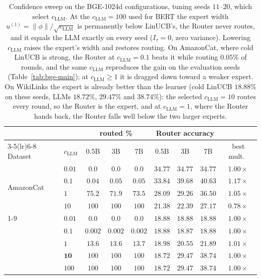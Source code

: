 \documentclass[anon]{alt2027} %
\begin{document}
\begin{table}[ht]
\centering
\caption{Confidence sweep on the BGE-1024d configurations, tuning seeds
$11$--$20$, which select $c_{\mathrm{LLM}}$. At the
$c_{\mathrm{LLM}}=100$ used for BERT the expert width $u^{(1)}=\|\phi\|/\sqrt{c_{\mathrm{LLM}}}$ is
permanently below LinUCB's, the Router never routes, and it equals the
LLM exactly on every seed ($I_\tau=0$, zero variance). Lowering $c_{\mathrm{LLM}}$ raises the
expert's width and restores routing. On AmazonCat, where cold LinUCB is
strong, the Router at $c_{\mathrm{LLM}}=0.1$ beats it while routing $0.05\%$ of rounds, and
the same $c_{\mathrm{LLM}}$ reproduces the gain on the evaluation seeds
(Table~\ref{tab:bge-main}); at $c_{\mathrm{LLM}}\ge1$ it is dragged down toward a
weaker expert. On WikiLinks the expert is
already better than the learner (cold
LinUCB $18.88\%$ on these seeds, LLMs $18.72\%$, $29.47\%$ and $38.74\%$): the
selected $c_{\mathrm{LLM}}=10$ routes every round, so the Router is the expert, and at
$c_{\mathrm{LLM}}=1$, where the Router hands back, the Router falls well below the two
larger experts.}
\label{tab:bge-csweep}
\scriptsize
\setlength{\tabcolsep}{4pt}
\begin{tabular}{@{}llccccccc@{}}
\toprule
& & \multicolumn{3}{c}{routed \%} & \multicolumn{3}{c}{Router accuracy} & \\
\cmidrule(lr){3-5}\cmidrule(lr){6-8}
Dataset & $c_{\mathrm{LLM}}$ & 0.5B & 3B & 7B & 0.5B & 3B & 7B & best mult.\ \\
\midrule
\multirow{4}{*}{AmazonCat} & $0.01$ & $0.0$ & $0.0$ & $0.0$ & $34.77$ & $34.77$ & $34.77$ & $1.00\times$ \\
 & $\mathbf{0.1}$ & $0.04$ & $0.05$ & $0.05$ & $33.84$ & $39.68$ & $\mathbf{40.63}$ & $\mathbf{1.17\times}$ \\
 & $1$  & $75.2$ & $71.9$ & $73.5$ & $28.09$ & $29.26$ & $36.50$ & $1.05\times$ \\
 & $10$ & $100$ & $100$ & $100$ & $21.38$ & $22.39$ & $27.17$ & $0.78\times$ \\
\cmidrule(lr){1-9}
\multirow{5}{*}{WikiLinks} & $0.01$ & $0.0$ & $0.0$ & $0.0$ & $18.88$ & $18.88$ & $18.88$ & $1.00\times$ \\
 & $0.1$ & $0.002$ & $0.002$ & $0.002$ & $18.88$ & $18.87$ & $18.88$ & $1.00\times$ \\
 & $1$  & $13.6$ & $13.6$ & $13.7$ & $18.98$ & $20.55$ & $21.89$ & $1.01\times$ \\
 & $\mathbf{10}$ & $100$ & $100$ & $100$ & $18.72$ & $29.47$ & $\mathbf{38.74}$ & $1.00\times$ \\
 & $100$ & $100$ & $100$ & $100$ & $18.72$ & $29.47$ & $38.74$ & $1.00\times$ \\
\bottomrule
\end{tabular}
\end{table}
\end{document}
